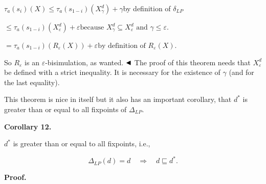 \documentclass[10pt,a4paper]{article}
\begin{document}
\par  \quad  $\displaystyle\tau_{a}(s_{i})(X)$\quad  $\displaystyle\leq\tau_{a}(s_{1-i})(X^{d}_{\gamma})+\gamma$\quad  by definition of $\delta_{LP}$\quad  \quad  
 
\par  \quad  \quad  $\displaystyle\leq\tau_{a}(s_{1-i})(X^{d}_{\varepsilon})+\varepsilon$\quad  $\displaystyle\mbox{because }X^{d}_{\gamma}\subseteq X^{d}_{\varepsilon}\mbox{ and }\gamma\leq\varepsilon.$\quad  \quad  
 
\par  \quad  \quad  $\displaystyle=\tau_{a}(s_{1-i})(R_{\varepsilon}(X))+\varepsilon$\quad  $\displaystyle\mbox{by definition of }R_{\varepsilon}(X).$\quad  \quad  
  
So $R_{\varepsilon}$ is an $\varepsilon$-bisimulation, as wanted. $\hfill\blacktriangleleft$ The proof of this theorem needs that $X_{\varepsilon}^{d}$ be defined with a strict inequality. It is necessary for the existence of $\gamma$ (and for the last equality).\par
 
 
 
This theorem is nice in itself but it also has an important corollary, that $d^{*}$ is greater than or equal to all fixpoints of $\Delta_{LP}$.\par
 
 
 
\par\medskip\noindent\textbf{Corollary 12.}\par
 
 
$d^{*}$ is greater than or equal to all fixpoints, i.e.,\par
  
\par  \quad  \[\Delta_{LP}(d)=d\quad\Longrightarrow\quad d\sqsubseteq d^{*}.\]\quad  \quad  
  
 
 
 
 
\par\medskip\noindent\textbf{Proof.}\par
 
\end{document}

